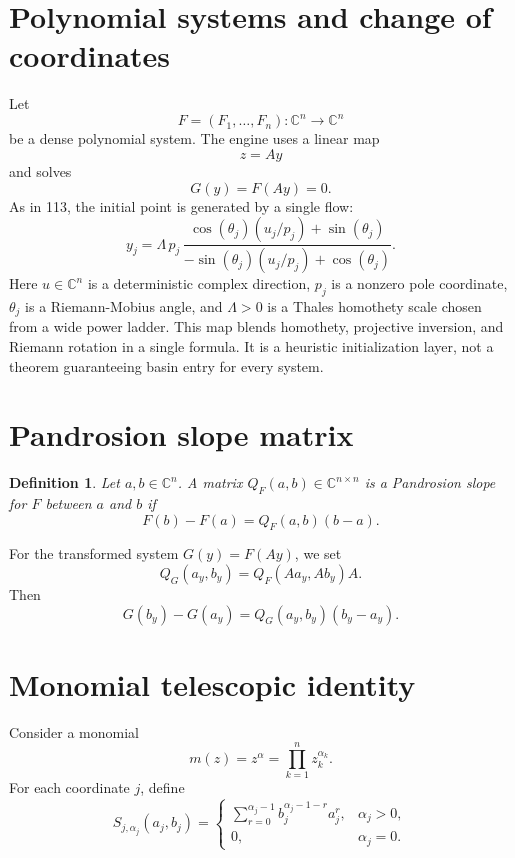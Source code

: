 \documentclass[11pt,a4paper]{article}
\newtheorem{definition}{Definition}
\begin{document}
\section{Polynomial systems and change of coordinates}
Let
\[
  F=(F_1,\ldots,F_n):\mathbb C^n\to\mathbb C^n
\]
be a dense polynomial system. The engine uses a linear map
\[
  z=Ay
\]
and solves
\[
  G(y)=F(Ay)=0.
\]
As in 113, the initial point is generated by a single flow:
\begin{equation}
  y_j
  = \Lambda\,p_j\,
    \frac{\cos(\theta_j)(u_j/p_j)+\sin(\theta_j)}
         {-\sin(\theta_j)(u_j/p_j)+\cos(\theta_j)}.
  \label{eq:mobius115}
\end{equation}
Here \(u\in\mathbb C^n\) is a deterministic complex direction, \(p_j\) is a nonzero pole coordinate, \(\theta_j\) is a Riemann-Mobius angle, and \(\Lambda>0\) is a Thales homothety scale chosen from a wide power ladder. This map blends homothety, projective inversion, and Riemann rotation in a single formula. It is a heuristic initialization layer, not a theorem guaranteeing basin entry for every system.

\section{Pandrosion slope matrix}
\begin{definition}
Let \(a,b\in\mathbb C^n\). A matrix \(Q_F(a,b)\in\mathbb C^{n\times n}\) is a Pandrosion slope for \(F\) between \(a\) and \(b\) if
\begin{equation}
  F(b)-F(a)=Q_F(a,b)(b-a).
  \label{eq:slope-identity}
\end{equation}
\end{definition}

For the transformed system \(G(y)=F(Ay)\), we set
\begin{equation}
  Q_G(a_y,b_y)=Q_F(Aa_y,Ab_y)A.
  \label{eq:chain-slope}
\end{equation}
Then
\[
  G(b_y)-G(a_y)=Q_G(a_y,b_y)(b_y-a_y).
\]

\section{Monomial telescopic identity}
Consider a monomial
\[
  m(z)=z^\alpha=\prod_{k=1}^n z_k^{\alpha_k}.
\]
For each coordinate \(j\), define
\begin{equation}
  S_{j,\alpha_j}(a_j,b_j)=
  \begin{cases}
  \displaystyle \sum_{r=0}^{\alpha_j-1} b_j^{\alpha_j-1-r}a_j^r,& \alpha_j>0,\\
  0,& \alpha_j=0.
  \end{cases}
  \label{eq:power-slope}
\end{equation}
\end{document}
